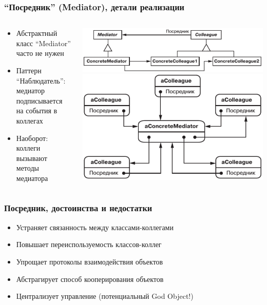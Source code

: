 \documentclass[xetex,mathserif,serif]{beamer}
\begin{document}
	\begin{frame}
		\frametitle{``Посредник'' (Mediator), детали реализации}
		\begin{columns}
			\begin{column}{0.5\textwidth}
				\begin{itemize}
					\item Абстрактный класс ``Mediator'' часто не нужен
					\item Паттерн ``Наблюдатель'': медиатор подписывается на события в коллегах
					\item Наоборот: коллеги вызывают методы медиатора
				\end{itemize}
			\end{column}
			\begin{column}{0.5\textwidth}
				\begin{center}
					\includegraphics[width=\textwidth]{mediatorClasses.png}
					\vspace{1cm}
					\includegraphics[width=\textwidth]{mediatorObjects.png}
				\end{center}
			\end{column}
		\end{columns}
	\end{frame}

	\begin{frame}
		\frametitle{Посредник, достоинства и недостатки}
		\begin{itemize}
			\item Устраняет связанность между классами-коллегами
			\item Повышает переиспользуемость классов-коллег
			\item Упрощает протоколы взаимодействия объектов
			\item Абстрагирует способ кооперирования объектов
			\item Централизует управление (потенциальный God Object!)
		\end{itemize}
	\end{frame}
\end{document}
